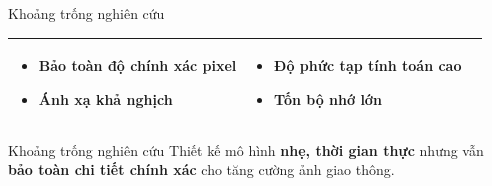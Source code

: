\begin{frame}{Khoảng trống nghiên cứu}
\begin{table}[]
{\begin{tabular}{|l|l|l|}
\begin{minipage}{0.3\textwidth}
        \begin{itemize}
            \item Bảo toàn độ chính xác pixel
            \item Ánh xạ khả nghịch
        \end{itemize}
        \end{minipage} & 
        \begin{minipage}{0.3\textwidth}
        \begin{itemize}
            \item Độ phức tạp tính toán cao
            \item Tốn bộ nhớ lớn
        \end{itemize}
        \end{minipage} \\ \hline
        \end{tabular}%
        }
    \end{table}
    \vspace{0.1cm}
    \begin{block}{Khoảng trống nghiên cứu}
        Thiết kế mô hình \textbf{nhẹ, thời gian thực} nhưng vẫn \textbf{bảo toàn chi tiết chính xác} cho tăng cường ảnh giao thông.
    \end{block}
\end{frame}
